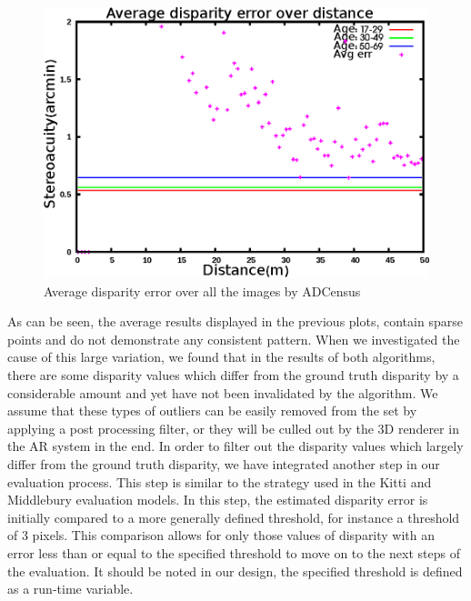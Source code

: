 \begin{figure}[H]
\centering
\includegraphics[scale=0.8]{adcenmsk1000}
\caption{Average disparity error over all the images by ADCensus}
\label{fig:mskmapadc}
\end{figure} 

As can be seen, the average results displayed in the previous plots, contain sparse points and 
do not demonstrate any consistent pattern. When we investigated the cause of this large variation, we found that in
the results of both algorithms, there are some disparity values which differ from the ground truth disparity 
by a considerable amount and yet have not been invalidated by the
algorithm. We assume that these types of outliers can be easily removed from the set by applying a post processing filter, or 
they will be culled out by the 3D renderer in the AR system in the end. 
In order to filter out the disparity values which largely differ from the ground truth disparity, we have integrated another 
step in our evaluation process. This step is similar to the strategy used in the Kitti and Middlebury evaluation models.
In this step, the estimated disparity error is initially compared to a more generally defined threshold, for instance a threshold of 3 pixels.
This comparison allows for only those values of disparity with an error less than or equal to the specified threshold to 
move on to the next steps of the evaluation. It should be noted in our design, the specified threshold is defined as a run-time variable. 

